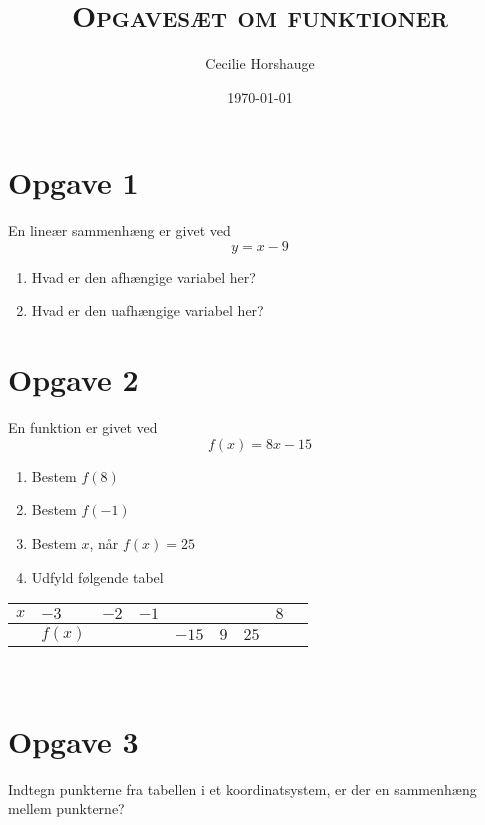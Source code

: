 \documentclass[a4paper, 11pt]{article}
\title{{\large \textsc{Opgavesæt om funktioner}}}
\author{Cecilie Horshauge}
\date{\today}
\begin{document}
\maketitle
\noindent 

\section*{Opgave 1} 
En lineær sammenhæng er givet ved
\[y=x-9\]
\begin{enumerate}[label=\alph*)]
    \item Hvad er den afhængige variabel her?
    \item Hvad er den uafhængige variabel her?
\end{enumerate}

\section*{Opgave 2} 
En funktion er givet ved 
\[f(x)=8x-15\]
\begin{enumerate}[label=\alph*)]
    \item Bestem \(f(8)\)
    \item Bestem \(f(-1)\)
    \item Bestem \(x\), når \(f(x)=25\)
    \item Udfyld følgende tabel
\end{enumerate}
\begin{tabular}{ | m{1 cm} | m{1 cm}| m{1 cm} | m{1 cm} | m{1 cm}| m{1 cm}| m{1 cm}| m{1 cm}| m{1 cm}| }
    \hline
    \(x\) & \(-3\) & \(-2\) & \(-1\) & &  & & \(8\)\\ 
    \hline
    &\(f(x)\) & & &\(-15\)& \(9\)& \(25\)&\\ 
    \hline
  \end{tabular}\\
\section*{Opgave 3}
Indtegn punkterne fra tabellen i et koordinatsystem, er der en sammenhæng mellem punkterne?
\end{document}
